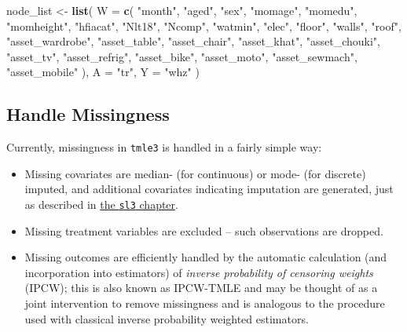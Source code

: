 \documentclass[12pt, krantz2,]{book}
\newenvironment{Shaded}{\begin{snugshade}}{\end{snugshade}}
\newcommand{\DataTypeTok}[1]{\textcolor[rgb]{0.13,0.29,0.53}{#1}}
\newcommand{\KeywordTok}[1]{\textcolor[rgb]{0.13,0.29,0.53}{\textbf{#1}}}
\newcommand{\NormalTok}[1]{#1}
\newcommand{\StringTok}[1]{\textcolor[rgb]{0.31,0.60,0.02}{#1}}
\providecommand{\tightlist}{%
  \setlength{\itemsep}{0pt}\setlength{\parskip}{0pt}}
\theoremstyle{definition}
\theoremstyle{definition}
\theoremstyle{definition}
\newcommand{\1}{\mathbbm{1}}
\begin{document}
\begin{Shaded}
\begin{Highlighting}[]
\NormalTok{node_list <-}\StringTok{ }\KeywordTok{list}\NormalTok{(}
  \DataTypeTok{W =} \KeywordTok{c}\NormalTok{(}
    \StringTok{"month"}\NormalTok{, }\StringTok{"aged"}\NormalTok{, }\StringTok{"sex"}\NormalTok{, }\StringTok{"momage"}\NormalTok{, }\StringTok{"momedu"}\NormalTok{,}
    \StringTok{"momheight"}\NormalTok{, }\StringTok{"hfiacat"}\NormalTok{, }\StringTok{"Nlt18"}\NormalTok{, }\StringTok{"Ncomp"}\NormalTok{, }\StringTok{"watmin"}\NormalTok{,}
    \StringTok{"elec"}\NormalTok{, }\StringTok{"floor"}\NormalTok{, }\StringTok{"walls"}\NormalTok{, }\StringTok{"roof"}\NormalTok{, }\StringTok{"asset_wardrobe"}\NormalTok{,}
    \StringTok{"asset_table"}\NormalTok{, }\StringTok{"asset_chair"}\NormalTok{, }\StringTok{"asset_khat"}\NormalTok{,}
    \StringTok{"asset_chouki"}\NormalTok{, }\StringTok{"asset_tv"}\NormalTok{, }\StringTok{"asset_refrig"}\NormalTok{,}
    \StringTok{"asset_bike"}\NormalTok{, }\StringTok{"asset_moto"}\NormalTok{, }\StringTok{"asset_sewmach"}\NormalTok{,}
    \StringTok{"asset_mobile"}
\NormalTok{  ),}
  \DataTypeTok{A =} \StringTok{"tr"}\NormalTok{,}
  \DataTypeTok{Y =} \StringTok{"whz"}
\NormalTok{)}
\end{Highlighting}
\end{Shaded}

\hypertarget{handle-missingness}{%
\subsection{Handle Missingness}\label{handle-missingness}}

Currently, missingness in \texttt{tmle3} is handled in a fairly simple way:

\begin{itemize}
\tightlist
\item
  Missing covariates are median- (for continuous) or mode- (for discrete)
  imputed, and additional covariates indicating imputation are generated, just
  as described in \protect\hyperlink{sl3}{the \texttt{sl3} chapter}.
\item
  Missing treatment variables are excluded -- such observations are dropped.
\item
  Missing outcomes are efficiently handled by the automatic calculation (and
  incorporation into estimators) of \emph{inverse probability of censoring weights}
  (IPCW); this is also known as IPCW-TMLE and may be thought of as a joint
  intervention to remove missingness and is analogous to the procedure used with
  classical inverse probability weighted estimators.
\end{itemize}
\end{document}
